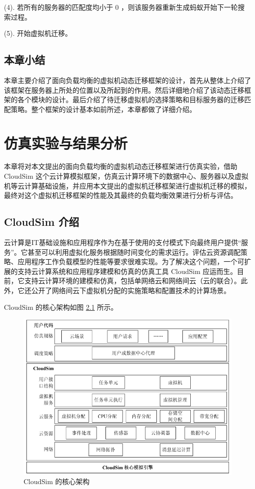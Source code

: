    (4). 若所有的服务器的匹配度均小于 0 ，则该服务器重新生成蚂蚁开始下一轮搜索过程。

    (5). 开始虚拟机迁移。

\section{本章小结}
本章主要介绍了面向负载均衡的虚拟机动态迁移框架的设计，首先从整体上介绍了该框架在服务器上所处的位置以及所起到的作用。然后详细地介绍了该动态迁移框架的各个模块的设计。最后介绍了待迁移虚拟机的选择策略和目标服务器的迁移匹配策略。整个框架的设计基本如前所述，本章都做了详细介绍。

\chapter{仿真实验与结果分析}
本章将对本文提出的面向负载均衡的虚拟机动态迁移框架进行仿真实验，借助 CloudSim 这个云计算模拟框架，仿真云计算环境下的数据中心、服务器以及虚拟机等云计算基础设施，并应用本文提出的虚拟机迁移框架进行虚拟机迁移的模拟，最终对这个虚拟机迁移框架的性能及其最终的负载均衡效果进行分析与评估。

\section{CloudSim 介绍}
云计算是IT基础设施和应用程序作为在基于使用的支付模式下向最终用户提供“服务”。它甚至可以利用虚拟化服务根据随时间变化的需求运行。评估云资源调配策略、应用程序工作负载模型的性能等要求很难实现。为了解决这个问题，一个可扩展的支持云计算系统和应用程序建模和仿真的仿真工具 CloudSim 应运而生\cite{Atanasov}。目前，它支持云计算环境的建模和仿真，包括单网络云和网络间云（云的联合）。此外，它还公开了网络间云下虚拟机分配的实施策略和配置技术的计算场景。

CloudSim 的核心架构如图 \ref{Fig:chap4_1} 所示。

\begin{figure}[htb]
  \centering
  \includegraphics{./Figure/IMG_Chap4_1.png}
  \caption{CloudSim 的核心架构}\label{Fig:chap4_1}
\end{figure}

